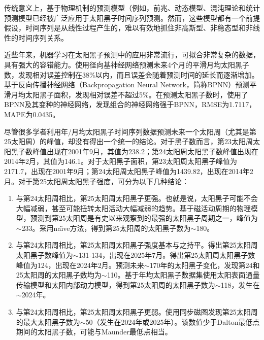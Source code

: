 传统意义上，基于物理机制的预测模型（例如，前兆、动态模型、混沌理论\citep{jie2012prediction}和统计预测模型已经被广泛应用于太阳黑子时间序列预测。然而，这些模型都有一个前提假设，时间序列是从线性过程产生的，难以有效地抓住非高斯型、非稳态型和非线性的时间序列关系\citep{jiang2011sunspot,arlt2015solar}。

近些年来，机器学习在太阳黑子预测中的应用非常流行\citep{pala2019forecasting}，可拟合非常复杂的数据，具有强大的容错能力。\citet{zhao2008prediction}使用径向基神经网络预测未来4个月的平滑月均太阳黑子数，发现相对误差控制在38\%以内，而且误差会随着预测时间的延长而逐渐增加。\citet{ding2012prediction}基于反向传播神经网络（Backpropagation Neural Network，简称BPNN）预测平滑月均太阳黑子面积，发现相对误差不超过5\%。\citet{li2018hybrid}在预测太阳黑子数时，使用了BPNN及其变种的神经网络，发现组合的神经网络强于BPNN，RMSE为1.7117，MAPE为0.0435。

尽管很多学者利用年/月均太阳黑子时间序列数据预测未来一个太阳周（尤其是第25太阳周）的峰值，却没有得出一个统一的结论。对于黑子数而言，第23太阳周太阳黑子数峰值出现在2001年9月，其值为238.2；第24太阳周太阳黑子数峰值出现在2014年2月，其值为146.1。对于太阳黑子面积，第23太阳周太阳黑子峰值为2171.7，出现在2001年9月；第24太阳周太阳黑子峰值为1439.82，出现在2014年2月。对于第25太阳周太阳黑子强度，可分为以下几种结论：
\begin{enumerate}
  \item 与第24太阳周相比，第25太阳周太阳黑子更强。也就是说，太阳黑子可能不会大幅减弱，甚至可能扭转太阳活动大幅减弱的趋势。\citet{mcintosh2020overlapping}基于磁活动周期的物理模型，预测到第25太阳周是有史以来观察到的最强的太阳黑子周期之一，峰值为$\sim$233。\citet{pesnell2018effects}采用na{\"\i}ve方法，得到第25太阳周的太阳黑子数为$\sim$180。
  \item 与第24太阳周相比，第25太阳周太阳黑子强度基本与之持平。\citet{bisoi2020another}得出第25太阳周太阳黑子数峰值为$\sim$131-134，出现在2025年7月。\citet{singh2019prediction}得出第25太阳周太阳黑子数峰值为124，出现在2024年2月。\citet{hiremath2008prediction}预测未来$\sim$170年的太阳黑子变化，发现第24和25太阳周的太阳黑子数均为$\sim$110。\citet{bhowmik2018prediction}基于年均太阳黑子数据集使用太阳表面通量传输模型和太阳内部动力模型，得到第25太阳周的太阳黑子数为$\sim$118，发生在$\sim$2024年。
  \item 与第24太阳周相比，第25太阳周太阳黑子更弱。\citet{kitiashvili2020application}使用同步磁图发现第25太阳周的最大太阳黑子数为$\sim$50（发生在2024年或2025年）。该数值少于Dalton最低点期间的太阳黑子数，可能与Maunder最低点相当。
\end{enumerate}

